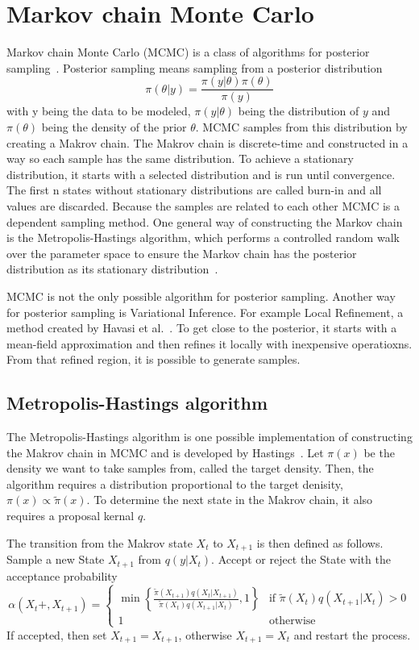 \section{Markov chain Monte Carlo}
Markov chain Monte Carlo (MCMC) is a class of algorithms 
for posterior sampling~\cite{wang2020brief}. 
Posterior sampling means sampling from a posterior distribution \[
\pi(\theta|y)=\frac{\pi(y|\theta)\pi(\theta)}{\pi(y)}
\]
with y being the data to be modeled, $\pi(y|\theta)$ 
being the distribution of $y$ and $\pi(\theta)$ 
being the density of the prior $\theta$.
MCMC samples from this distribution by creating a Makrov chain. 
The Makrov chain is discrete-time and constructed in a way so each sample 
has the same distribution. To achieve a stationary distribution, 
it starts with a selected distribution and is run until convergence. 
The first n states without stationary distributions are called 
burn-in and all values are discarded. Because the samples are 
related to each other MCMC is a dependent sampling method.
One general way of constructing the Markov chain is the 
Metropolis-Hastings algorithm, which performs a controlled 
random walk over the parameter space to ensure the Markov
chain has the posterior distribution as its stationary distribution~\cite{wang2020brief}. 

MCMC is not the only possible algorithm for posterior sampling. 
Another way for posterior sampling is Variational Inference. 
For example Local Refinement, a method created by 
Havasi et al.~\cite{havasi2021sampling}. 
To get close to the posterior, 
it starts with a mean-field approximation and then refines it 
locally with inexpensive operatioxns. From that refined region, 
it is possible to generate samples.
\subsection{Metropolis-Hastings algorithm}
The Metropolis-Hastings algorithm is one possible implementation of constructing the Makrov chain in MCMC and 
is developed by Hastings~\cite{hastings1970}.
Let $\pi(x)$ be the density we want to take samples from, called the target density.
Then, the algorithm requires a distribution proportional to the target denisity, $\pi(x)\propto\tilde{\pi}(x)$.
To determine the next state in the Makrov chain, it also requires a proposal kernal $q$.

The transition from the Makrov state $X_t$ to $X_{t+1}$ is then defined as follows.
Sample a new State  $X_{t+1}$ from $q(y | X_t)$. 
Accept or reject the State with the acceptance probability
\[ 
    \alpha(X_t+, X_{t+1}) = 
    \begin{cases}
        \min \left\{ \frac{\tilde{\pi}(X_{t+1}) q(X_t|X_{t+1} )}{\tilde{\pi}(X_t) q(X_{t+1}|X_t)}, 1 \right\} & \text{if } \tilde{\pi}(X_t)q(X_{t+1}|X_t)>0 \\
        1 & \text{otherwise}
    \end{cases}     
\]
If accepted, then set $X_{t+1}=X_{t+1}$, otherwise $X_{t+1}  = X_t$ and restart the process.

